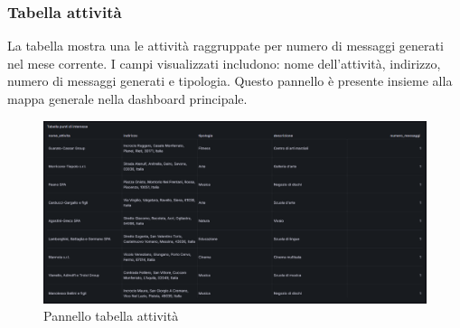 \documentclass[10pt]{article}
\begin{document}
\begin{justify}
    \subsubsection{Tabella attività}
    La tabella mostra una le attività raggruppate per numero di messaggi generati nel mese corrente. I campi visualizzati includono: nome dell'attività, indirizzo, numero di messaggi generati e tipologia. Questo pannello è presente insieme alla mappa generale nella dashboard principale.
    \begin{figure}[H]
    \centering
    \includegraphics[width=1\linewidth]{tabella.png}
    \caption{Pannello tabella attività}
    \end{figure}
    

\end{justify}
\end{document}
